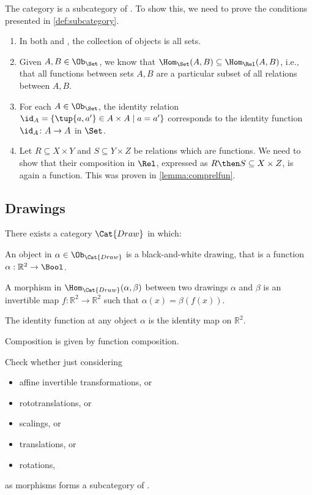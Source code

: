 \begin{example}
    The category \Set is a subcategory of \Rel. To show this, we need to prove the conditions presented in \cref{def:subcategory}.
	\begin{enumerate}
	\item In both \Rel and \Set, the collection of objects is all sets.
	\item Given $A,B\in \Ob_{\Set}$, we know that $\Hom_{\Set}(A,B)\subseteq \Hom_{\Rel}(A,B)$, i.e., that all functions between sets $A,B$ are a particular subset of all relations between $A,B$.
	\item For each $A\in \Ob_{\Set}$, the identity relation $\id_A=\{\tup{a,a'}\in A\times A\mid a=a'\}$ corresponds to the identity function $\id_A\colon A\to A$ in $\Set$.
	\item Let $R\subseteq X\times Y$ and $S\subseteq Y\times Z$ be relations which are functions. We need to show that their composition in $\Rel$, expressed as $R\then S\subseteq X\times Z$, is again a function. This was proven in \cref{lemma:comprelfun}.
	\end{enumerate}

\end{example}


\subsection{Drawings}

\newcommand{\Draw}{\Cat{Draw}}

\begin{definition}
There exists a category $\Draw$ in which:
\begin{compactenum}
\item An object in $\alpha\in \Ob_\Draw$ is a black-and-white drawing,
that is a function $\alpha : \mathbb{R}^2 \to \Bool$.
\item A morphism in $\Hom_{\Draw}(\alpha, \beta)$ between two drawings
$\alpha$ and $\beta$ is an invertible map $f: \mathbb{R}^2 \to \mathbb{R}^2$ such that
$\alpha(x) = \beta(f(x))$.
\item The identity function at any object $\alpha$ is the identity map 
on $\mathbb{R}^2$. 
\item Composition is given by function composition. 
\end{compactenum}
\end{definition}
 
 \begin{exercise}
Check whether just considering
    \begin{itemize}
        \item affine invertible transformations, or
        \item rototranslations, or
        \item scalings, or
        \item translations, or
        \item rotations,
    \end{itemize}
as morphisms forms a subcategory of \Draw.
 \end{exercise}
 
